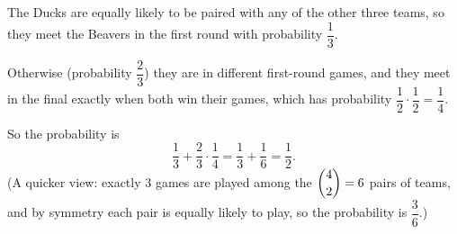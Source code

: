 The Ducks are equally likely to be paired with any of the other three teams, so they meet the Beavers in the first round with probability $\dfrac{1}{3}$.

Otherwise (probability $\dfrac{2}{3}$) they are in different first-round games, and they meet in the final exactly when both win their games, which has probability $\dfrac{1}{2}\cdot\dfrac{1}{2}=\dfrac{1}{4}$.

So the probability is
\[
\dfrac{1}{3}+\dfrac{2}{3}\cdot\dfrac{1}{4}=\dfrac{1}{3}+\dfrac{1}{6}=\boxed{\dfrac{1}{2}}.
\]
(A quicker view: exactly $3$ games are played among the $\dbinom42=6$ pairs of teams, and by symmetry each pair is equally likely to play, so the probability is $\dfrac{3}{6}$.)

